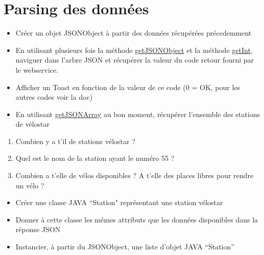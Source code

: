 \documentclass{article}
\begin{document}
\section{Parsing des données}
\begin{itemize} 
  \item Créer un objet JSONObject à partir des données récupérées précedemment
  \item En utilisant plusieurs fois la méthode \href{http://developer.android.com/reference/org/json/JSONObject.html#getJSONObject(java.lang.String)}{getJSONObject} et la méthode \href{http://developer.android.com/reference/org/json/JSONObject.html#getInt(java.lang.String)}{getInt}, naviguer dans l'arbre JSON et récupérer la valeur du code retour fourni par le webservice.
  \item Afficher un Toast en fonction de la valeur de ce code (0 = OK, pour les autres codes voir la doc)
  \item En utilisant \href{http://developer.android.com/reference/org/json/JSONObject.html#getJSONArray(java.lang.String)}{getJSONArray} au bon moment, récupérer l'ensemble des stations de vélostar
\end{itemize}
 \begin{enumerate}
 \setcounter{enumi}{0}
\item Combien y a t'il de stations vélostar ?
\item Quel est le nom de la station ayant le numéro 55 ?
\item Combien a t'elle de vélos disponibles ? A t'elle des places libres pour rendre un vélo ?
\end{enumerate}
\begin{itemize} 
  \item Créer une classe JAVA ``Station" représentant une station vélostar 
  \item Donner à cette classe les mêmes attributs que les données disponibles dans la réponse JSON
  \item Instancier, à partir du JSONObject, une liste d'objet JAVA ``Station''
\end{itemize}
\end{document}

